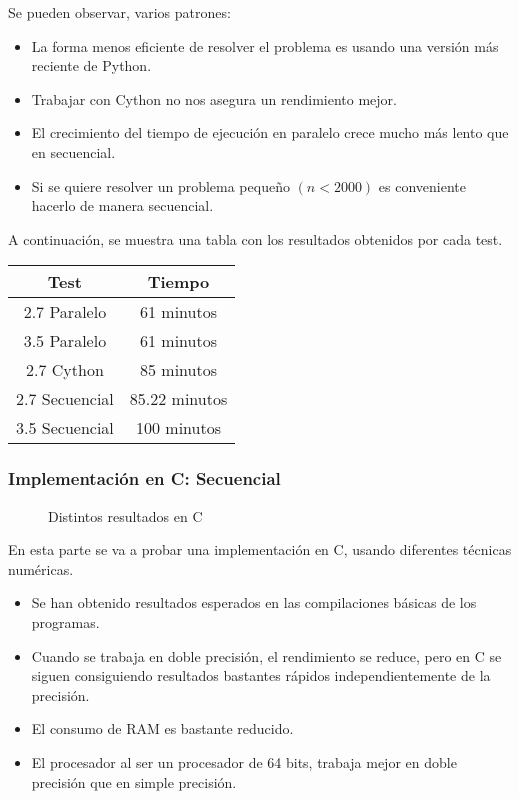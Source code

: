 \begin{ejemplo}
Se pueden observar, varios patrones:

\begin{itemize}
	\item La forma menos eficiente de resolver el problema es usando una versión más reciente de Python.
	\item Trabajar con Cython no nos asegura un rendimiento mejor.
	\item El crecimiento del tiempo de ejecución en paralelo crece mucho más lento que en secuencial.
	\item Si se quiere resolver un problema pequeño $(n < 2000)$ es conveniente hacerlo de manera secuencial.
\end{itemize}

A continuación, se muestra una tabla con los resultados obtenidos por cada test.
\begin{table}[H]
	\centering
	\begin{tabular}{|c|c|}
		\hline
		\textbf{Test}  & \textbf{Tiempo}        \\ \hline
		2.7 Paralelo   & 61 minutos    \\
		3.5 Paralelo   & 61 minutos   \\
		2.7 Cython     & 85 minutos    \\
		2.7 Secuencial & 85.22 minutos \\ 
		3.5 Secuencial & 100 minutos   \\
		\hline
	\end{tabular}%
\end{table}
\subsubsection{Implementación en C: Secuencial}
\begin{figure}[H]
	\centering
	\caption{Distintos resultados en C}
	\label{fig:eulercseq}
\end{figure}
En esta parte se va a probar una implementación en C, usando diferentes técnicas numéricas.
\begin{itemize}
	\item Se han obtenido resultados esperados en las compilaciones básicas de los programas.
	\item Cuando se trabaja en doble precisión, el rendimiento se reduce, pero en C se siguen consiguiendo resultados bastantes rápidos independientemente de la precisión.
	\item El consumo de RAM es bastante reducido.
	\item El procesador al ser un procesador de 64 bits, trabaja mejor en doble precisión que en simple precisión.
\end{itemize}


\end{ejemplo}
